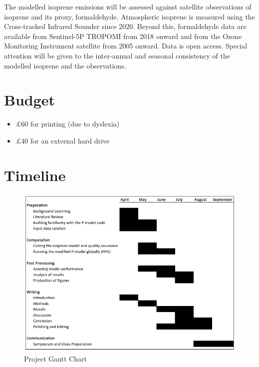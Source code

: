 \documentclass[11pt] {article}
\begin{document}
    \vskip 0.2in
    
    \noindent The modelled isoprene emissions will be assessed against satellite observations of isoprene and its proxy, formaldehyde. Atmospheric isoprene is measured using the Cross-tracked Infrared Sounder  since 2020. Beyond this, formaldehyde data are available from Sentinel-5P TROPOMI from 2018 onward and from the Ozone Monitoring Instrument satellite from 2005 onward. Data is open access. Special attention will be given to the inter-annual and seasonal consistency of the modelled isoprene and the observations. 
    

    \section{Budget}
    \begin{itemize}
        \item £60 for printing (due to dyslexia)
        \item £40 for an external hard drive
    \end{itemize}


\newpage

    \section{Timeline}

    \begin{figure}[!ht]
    \centering
    \includegraphics[width=\textwidth]{Timeline.png}
    \caption{Project Gantt Chart}
    \label{timeline}
   \end{figure}
    
    
    
    \newpage
    
    
    

    
\end{document}
